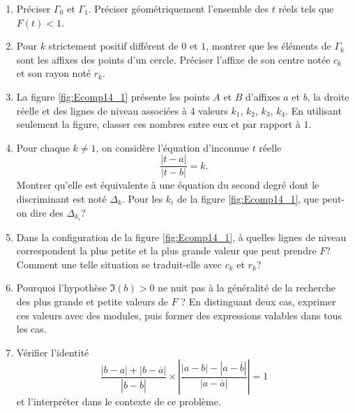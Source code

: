 \begin{enumerate}
  \item Préciser $\Gamma_0$ et $\Gamma_1$. Préciser géométriquement l'ensemble des $t$ réels tels que $F(t)<1$.
  \item Pour $k$ strictement positif différent de $0$ et $1$, montrer que les éléments de $\Gamma_k$ sont les affixes des points d'un cercle. Préciser l'affixe de son centre notée $c_k$ et son rayon noté $r_k$.
  \item La figure \ref{fig:Ecomp14_1} présente les points $A$ et $B$ d'affixes $a$ et $b$, la droite réelle et des lignes de niveau associées à 4 valeurs $k_1$, $k_2$, $k_3$, $k_4$. En utilisant seulement la figure, classer ces nombres entre eux et par rapport à $1$.
  \item Pour chaque $k\neq1$, on considère l'équation d'inconnue $t$ réelle
  \begin{displaymath}
    \frac{|t-a|}{|t-b|} = k .
  \end{displaymath}
Montrer qu'elle est équivalente à une équation du second degré dont le discriminant est noté $\Delta_k$. Pour les $k_i$ de la figure \ref{fig:Ecomp14_1}, que peut-on dire des $\Delta_{k_i}$?
\item Dans la configuration de la figure \ref{fig:Ecomp14_1}, à quelles lignes de niveau correspondent la plus petite et la plus grande valeur que peut prendre $F$? Comment une telle situation se traduit-elle avec $c_k$ et $r_k$?

\item Pourquoi l'hypothèse $\Im(b)>0$ ne nuit pas à la généralité de la recherche des plus grande et petite valeurs de $F$ ? En distinguant deux cas, exprimer ces valeurs avec des modules, puis former des expressions valables dans tous les cas.

\item Vérifier l'identité
\begin{displaymath}
  \frac{|b-a|+|b-\overline{a}|}{|b-\overline{b}|}\times \left|\frac{|a-b|-|a-\overline{b}|}{|a-\overline{a}|}\right| = 1
\end{displaymath}
et l'interpréter dans le contexte de ce problème.
\end{enumerate}

